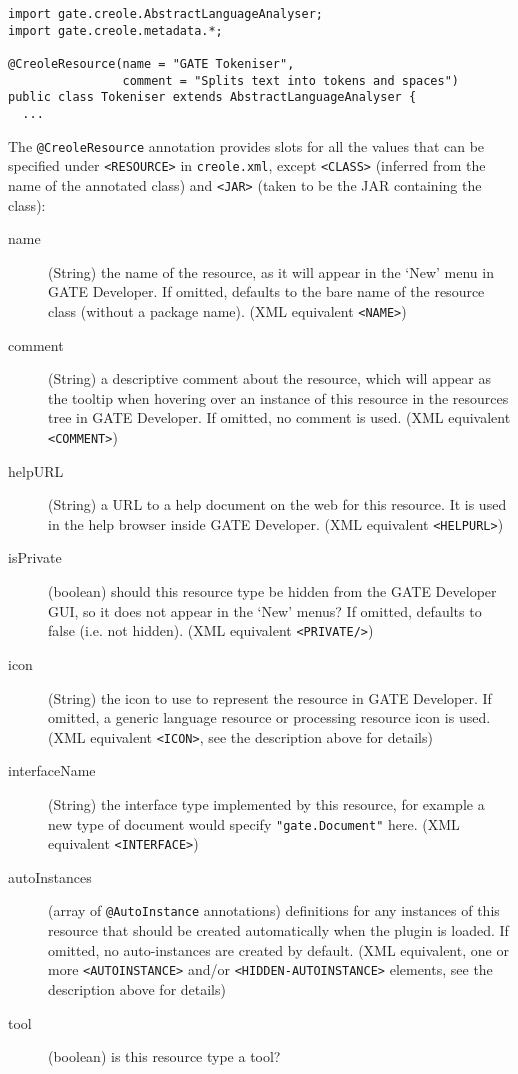 \begin{lstlisting}
import gate.creole.AbstractLanguageAnalyser;
import gate.creole.metadata.*;

@CreoleResource(name = "GATE Tokeniser",
                comment = "Splits text into tokens and spaces")
public class Tokeniser extends AbstractLanguageAnalyser {
  ...
\end{lstlisting}

The \verb|@CreoleResource| annotation provides slots for all the values that
can be specified under \verb|<RESOURCE>| in {\tt creole.xml}, except
\verb|<CLASS>| (inferred from the name of the annotated class) and \verb|<JAR>|
(taken to be the JAR containing the class):
\begin{description}
\item[name] (String) the name of the resource, as it will appear in the `New'
  menu in GATE Developer.  If omitted, defaults to the bare name of the resource
  class (without a package name). (XML equivalent \verb|<NAME>|)
\item[comment] (String) a descriptive comment about the resource, which will
  appear as the tooltip when hovering over an instance of this
  resource in the resources tree in GATE Developer.  If omitted, no
  comment is used. (XML equivalent \verb|<COMMENT>|)
\item[helpURL] (String) a URL to a help document on the web for this
  resource. It is used in the help browser inside GATE Developer. (XML
  equivalent \verb|<HELPURL>|)
\item[isPrivate] (boolean) should this resource type be hidden from the GATE Developer GUI, so
  it does not appear in the `New' menus?  If omitted, defaults to
  false (i.e.  not hidden). (XML equivalent \verb|<PRIVATE/>|)
\item[icon] (String) the icon to use to represent the resource in GATE Developer.
  If omitted, a generic language resource or processing resource icon
  is used.  (XML equivalent \verb|<ICON>|, see the description above
  for details)
\item[interfaceName] (String) the interface type implemented by this resource,
  for example a new type of document would specify \verb|"gate.Document"| here.
  (XML equivalent \verb|<INTERFACE>|)
\item[autoInstances] (array of {\tt @AutoInstance} annotations) definitions for
  any instances of this resource that should be created automatically when the
  plugin is loaded.  If omitted, no auto-instances are created by default. (XML
  equivalent, one or more \verb|<AUTOINSTANCE>| and/or
  \verb|<HIDDEN-AUTOINSTANCE>| elements, see the description above for details)
\item[tool] (boolean) is this resource type a tool?
\end{description}

